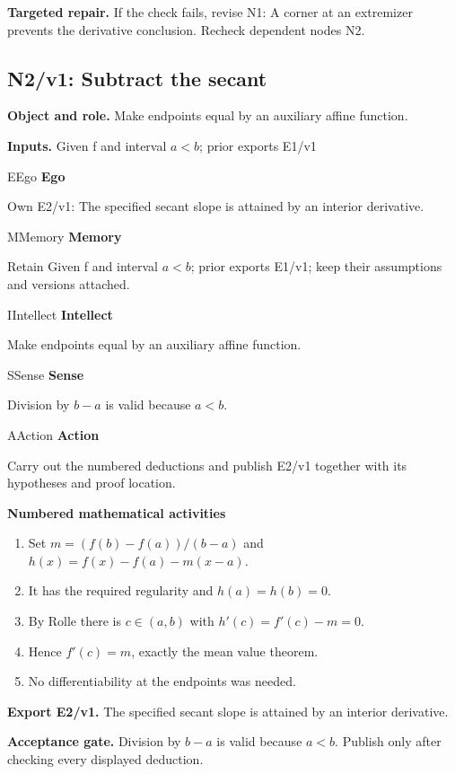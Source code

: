 \documentclass[preprint,12pt,aps,pra,showkeys,amsmath,amssymb,superscriptaddress,floatfix]{revtex4-2}
\theoremstyle{definition}
\theoremstyle{remark}
\newcommand{\mmfaculty}[3]{%
 \begin{mmfacultybox}{#1}{#2}
 {\sffamily\bfseries\color{MMBlue}#2}\par\smallskip #3
 \end{mmfacultybox}}
\newcommand{\field}[2]{\par\smallskip\noindent\textbf{#1.} #2\par}
\begin{document}
\field{Targeted repair}{If the check fails, revise N1: A corner at an extremizer prevents the
derivative conclusion. Recheck dependent nodes N2.}

\clearpage

\subsection{N2/v1: Subtract the secant}

\field{Object and role}{Make endpoints equal by an auxiliary affine function.}

\field{Inputs}{Given f and interval \(a<b\); prior exports E1/v1}

\mmfaculty{E}{Ego}{Own E2/v1: The specified secant slope is attained by an interior
derivative.}

\mmfaculty{M}{Memory}{Retain Given f and interval \(a<b\); prior exports E1/v1; keep their
assumptions and versions attached.}

\mmfaculty{I}{Intellect}{Make endpoints equal by an auxiliary affine function.}

\mmfaculty{S}{Sense}{Division by \(b-a\) is valid because \(a<b\).}

\mmfaculty{A}{Action}{Carry out the numbered deductions and publish E2/v1 together with its
hypotheses and proof location.}

\smallskip\noindent\textbf{Numbered mathematical activities}

\begin{enumerate}[label=N2.\arabic*,leftmargin=3.4em]

\item Set \(m=(f(b)-f(a))/(b-a)\) and \(h(x)=f(x)-f(a)-m(x-a)\).

\item It has the required regularity and \(h(a)=h(b)=0\).

\item By Rolle there is \(c\in (a,b)\) with \(h'(c)=f'(c)-m=0\).

\item Hence \(f'(c)=m\), exactly the mean value theorem.

\item No differentiability at the endpoints was needed.

\end{enumerate}

\field{Export E2/v1}{The specified secant slope is attained by an interior derivative.}

\field{Acceptance gate}{Division by \(b-a\) is valid because \(a<b\). Publish only after
checking every displayed deduction.}
\end{document}
